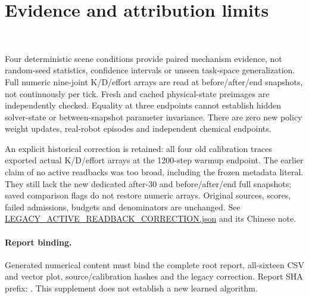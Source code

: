 \documentclass{article}
\begin{document}
\section{Evidence and attribution limits}
\ResultDiscussion\ \IntervalCoverage\ \SampleCounts\par
Four deterministic scene conditions provide paired mechanism
evidence, not random-seed statistics, confidence intervals or unseen
task-space generalization. Full numeric nine-joint K/D/effort arrays
are read at before/after/end snapshots, not continuously per tick.
Fresh and cached physical-state preimages are independently checked.
Equality at three endpoints cannot establish hidden solver-state or
between-snapshot parameter invariance. There are zero new policy
weight updates, real-robot episodes and independent chemical endpoints.

An explicit historical correction is retained: all four old
calibration traces exported actual K/D/effort arrays at the 1200-step
warmup endpoint. The earlier claim of no active readbacks was too
broad, including the frozen metadata literal. They still lack the
new dedicated after-30 and before/after/end full snapshots; saved
comparison flags do not restore numeric arrays. Original sources,
scores, failed admissions, budgets and denominators are unchanged.
See \href{../../../independent_audit/LEGACY_ACTIVE_READBACK_CORRECTION.json}
{LEGACY\_ACTIVE\_READBACK\_CORRECTION.json} and its Chinese note.

\paragraph{Report binding.}
Generated numerical content must bind the complete root report,
all-sixteen CSV and vector plot, source/calibration hashes and the
legacy correction. Report SHA prefix: \texttt{\ReportInputSHA}.
This supplement does not establish a new learned algorithm.
\end{document}
